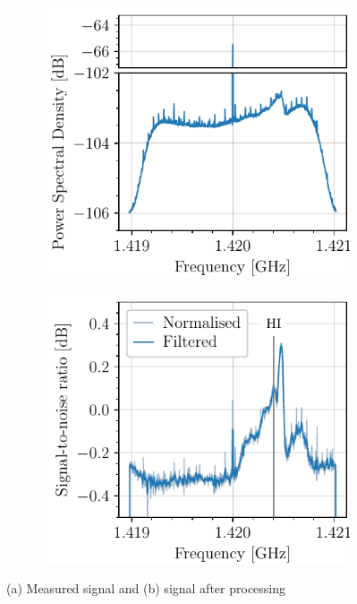 \begin{figure}
    \begin{subfigure}{0.49\textwidth}
        \centering
        \includegraphics[scale=1]{figures/raw_signal.pdf}
        \caption{}
        \label{fig:raw_signal}
    \end{subfigure}
    \begin{subfigure}{0.49\textwidth}
        \centering
        \includegraphics[scale=1]{figures/clean_signal.pdf}
        \caption{}
        \label{fig:clean_signal}
    \end{subfigure}
    \caption{(a) Measured signal and (b) signal after processing}
    \label{fig:process_example}
\end{figure}



